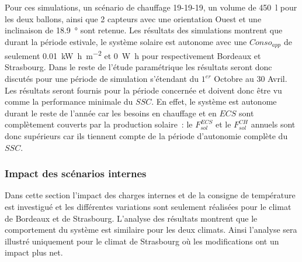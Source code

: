 Pour ces simulations, un scénario de chauffage 19-19-19, un volume de \SI{450}{\litre}
pour les deux ballons, ainsi que \num{2} capteurs avec une orientation Ouest et une
inclinaison de \SI{18.9}{\degree} sont retenue. Les résultats des simulations montrent
que durant la période estivale, le système solaire est autonome avec une $Conso_{app}$ de
seulement \SI[per-mode=symbol]{0.01}{\kilo\watt\hour\per\metre\squared} et \SI{0}{\watt\hour}
pour respectivement Bordeaux et Strasbourg.
Dans le reste de l’étude paramétrique les résultats seront donc discutés pour une période
de simulation s’étendant du $1^{er}$ Octobre au $30$ Avril. Les résultats seront fournis
pour la période concernée et doivent donc être vu comme la performance minimale du $SSC$.
En effet, le système est autonome durant le reste de l’année car les besoins en chauffage
et en $ECS$ sont complètement couverts par la production solaire~: le $F_{sol}^{ECS}$ et le
$F_{sol}^{CH}$ annuels sont donc supérieurs car ils tiennent compte de la période d’autonomie
complète du $SSC$.




\subsubsection{Impact des scénarios internes} %
\label{ssub:impact_des_scenarios_internes}
Dans cette section l’impact des charges internes et de la consigne de température est
investigué et les différentes variations sont seulement réalisées pour le climat
de Bordeaux et de Strasbourg. L’analyse des résultats montrent que le comportement
du système est similaire pour les deux climats. Ainsi l’analyse sera illustré
uniquement pour le climat de Strasbourg où les modifications ont un impact plus net.

